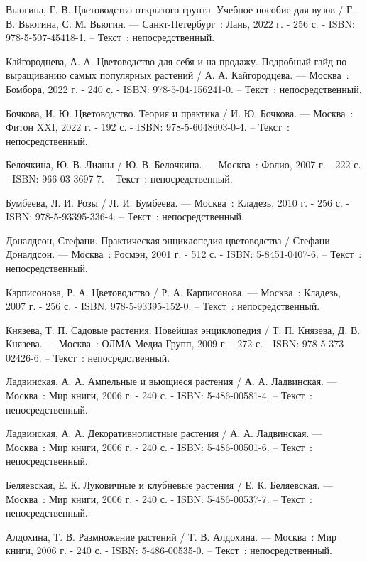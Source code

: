 \begin{thebibliography}{9}
	 Вьюгина, Г. В. Цветоводство открытого грунта. Учебное пособие для вузов / Г. В. Вьюгина, С. М. Вьюгин. — Санкт-Петербург~: Лань, 2022 г. - 256 с. - ISBN: 978-5-507-45418-1. – Текст~: непосредственный.
	
	 Кайгородцева, А. А. Цветоводство для себя и на продажу. Подробный гайд по выращиванию самых популярных растений / А. А. Кайгородцева. — Москва~: Бомбора, 2022 г. - 240 с. - ISBN: 978-5-04-156241-0. – Текст~: непосредственный.
	
	 Бочкова, И. Ю. Цветоводство. Теория и практика / И. Ю. Бочкова. — Москва~: Фитон XXI, 2022 г. - 192 с. - ISBN: 978-5-6048603-0-4. – Текст~: непосредственный.
	
	 Белочкина, Ю. В. Лианы / Ю. В. Белочкина. — Москва~: Фолио, 2007 г. - 222 с. - ISBN: 966-03-3697-7. – Текст~: непосредственный.
	
	 Бумбеева, Л. И. Розы / Л. И. Бумбеева. — Москва~: Кладезь, 2010 г. - 256 с. - ISBN: 978-5-93395-336-4. – Текст~: непосредственный.
	
	 Доналдсон, Стефани. Практическая энциклопедия цветоводства / Стефани Доналдсон. — Москва~: Росмэн, 2001 г. - 512 с. - ISBN: 5-8451-0407-6. – Текст~: непосредственный.
	
	 Карписонова, Р. А. Цветоводство / Р. А. Карписонова. — Москва~: Кладезь, 2007 г. - 256 с. - ISBN: 978-5-93395-152-0. – Текст~: непосредственный.
	
	 Князева, Т. П. Садовые растения. Новейшая энциклопедия / Т. П. Князева, Д. В. Князева. — Москва~: ОЛМА Медиа Групп, 2009 г. - 272 с. - ISBN: 978-5-373-02426-6. – Текст~: непосредственный.
	
	 Ладвинская, А. А. Ампельные и вьющиеся растения / А. А. Ладвинская. — Москва~: Мир книги, 2006 г. - 240 с. - ISBN: 5-486-00581-4. – Текст~: непосредственный.
	
	 Ладвинская, А. А. Декоративнолистные растения / А. А. Ладвинская. — Москва~: Мир книги, 2006 г. - 240 с. - ISBN: 5-486-00501-6. – Текст~: непосредственный.
	
	 Беляевская, Е. К. Луковичные и клубневые растения / Е. К. Беляевская. — Москва~: Мир книги, 2006 г. - 240 с. - ISBN: 5-486-00537-7. – Текст~: непосредственный.
	
	 Алдохина, Т. В. Размножение растений / Т. В. Алдохина. — Москва~: Мир книги, 2006 г. - 240 с. - ISBN: 5-486-00535-0. – Текст~: непосредственный.
	

\end{thebibliography}
